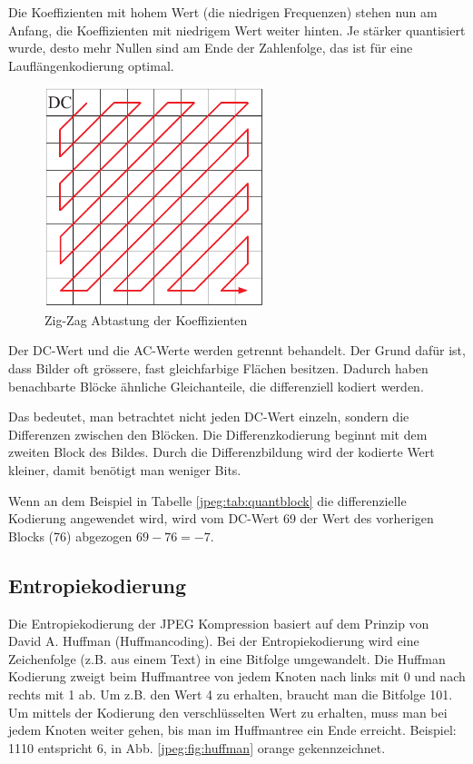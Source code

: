 Die Koeffizienten mit hohem Wert (die niedrigen Frequenzen) stehen nun am Anfang, die Koeffizienten mit niedrigem Wert weiter hinten.
Je stärker quantisiert wurde, desto mehr Nullen sind am Ende der Zahlenfolge, das ist für eine Lauflängenkodierung optimal.

\begin{figure}
    \centering
    \includegraphics[width=64mm]{papers/jpeg/pictures/zigzag.pdf}
    \caption{Zig-Zag Abtastung der Koeffizienten
        \label{jpeg:fig:zigzag}}
\end{figure}

Der DC-Wert und die AC-Werte werden getrennt behandelt.
Der Grund dafür ist, dass Bilder oft grössere, fast gleichfarbige Flächen besitzen.
Dadurch haben benachbarte Blöcke ähnliche Gleichanteile, die differenziell kodiert werden.

Das bedeutet, man betrachtet nicht jeden DC-Wert einzeln, sondern die Differenzen zwischen den Blöcken.
Die Differenzkodierung beginnt mit dem zweiten Block des Bildes.
Durch die Differenzbildung wird der kodierte Wert kleiner, damit benötigt man weniger Bits.

Wenn an dem Beispiel in Tabelle \ref{jpeg:tab:quantblock} die differenzielle Kodierung angewendet wird, wird vom DC-Wert 69 der Wert des vorherigen Blocks (76) abgezogen \(69-76 = -7\).

\subsection{Entropiekodierung
\label{jpeg:subsection:entropiekodierung}}
Die Entropiekodierung der JPEG Kompression basiert auf dem Prinzip von David A. Huffman (Huffmancoding).
Bei der Entropiekodierung wird eine Zeichenfolge (z.B. aus einem Text) in eine Bitfolge umgewandelt.
Die Huffman Kodierung zweigt beim Huffmantree von jedem Knoten nach links mit 0 und nach rechts mit 1 ab.
Um z.B. den Wert 4 zu erhalten, braucht man die Bitfolge 101.
Um mittels der Kodierung den verschlüsselten Wert zu erhalten, muss man bei jedem Knoten weiter gehen, bis man im Huffmantree ein Ende erreicht. Beispiel: 1110 entspricht 6, in Abb. \ref{jpeg:fig:huffman} orange gekennzeichnet.

